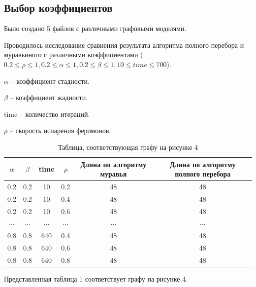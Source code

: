 \documentclass[a4paper,14pt]{article} %
\begin{document}
	\subsection{Выбор коэффициентов}
	\hfill
	
	Было создано 5 файлов с различными графовыми моделями. 
	
	Проводилось исследование сравнения результата алгоритма полного перебора и муравьиного с различными коэффициентами ($0.2 \le \rho \le 1, 0.2\le\alpha\le1, 0.2\le\beta\le1, 10\le time\le700$). 
	
	$\alpha$ -- коэффициент стадности. 
	
	$\beta$ -- коэффициент жадности. 
	
	time -- количество итераций. 
	
	$\rho$ -- скорость испарения феромонов. 
	
	\hfill
	
	\begin{table}[H]
	\caption{Таблица, соответствующая графу на рисунке 4}
	\begin{tabular}{|c|c|c|c|c|c|}
		\hline
		$\alpha$&$\beta$&time&$\rho$&Длина по алгоритму муравья&Длина по алгоритму полного перебора \\
		\hline
		0.2 &0.2 &10 &0.2 &48 &48\\
		0.2& 0.2 &10 &0.4 &48& 48\\
		0.2 &0.2 &10&0.6 &48 &48\\
		$\cdots$&$\cdots$&$\cdots$&$\cdots$&$\cdots$&$\cdots$\\
		0.8& 0.8& 640& 0.4& 48 &48\\
		0.8 &0.8& 640& 0.6& 48 &48\\
		0.8& 0.8& 640 &0.8 &48& 48\\
		\hline
	\end{tabular}
	\end{table}
	
	\hfill
	
	Представленная таблица 1 соответствует графу на рисунке 4. 
	
\end{document}
